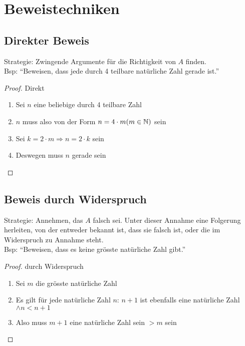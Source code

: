 \section{Beweistechniken}
\subsection{Direkter Beweis}
Strategie: Zwingende Argumente für die Richtigkeit von $A$ finden.\\
Bsp: \enquote{Beweisen, dass jede durch 4 teilbare natürliche Zahl gerade ist.}
\begin{proof}
Direkt
\begin{enumerate}\itemsep0em
	\item Sei $n$ eine beliebige durch 4 teilbare Zahl
	\item $n$ muss also von der Form $n = 4 \cdot m (m \in \mathbb{N})$ sein
	\item Sei $k = 2 \cdot m \Rightarrow n = 2 \cdot k$ sein
	\item Deswegen muss $n$ gerade sein \qedhere
\end{enumerate}
\end{proof}


\subsection{Beweis durch Widerspruch}
Strategie: Annehmen, das $A$ falsch sei. Unter dieser Annahme eine Folgerung
herleiten, von der entweder bekannt ist, dass sie falsch ist, oder die im
Widerspruch zu Annahme steht.\\
Bsp: \enquote{Beweisen, dass es keine grösste natürliche Zahl gibt.}

\begin{proof}
\renewcommand{\qedsymbol}{\lightning}
durch Widerspruch
	\begin{enumerate}\itemsep0em
		\item Sei $m$ die grösste natürliche Zahl
		\item Es gilt für jede natürliche Zahl $n$: $n + 1$ ist ebenfalls eine natürliche Zahl $\wedge n < n + 1$
		\item Also muss $m + 1$ eine natürliche Zahl sein $> m$ sein \qedhere
	\end{enumerate}
\end{proof}


